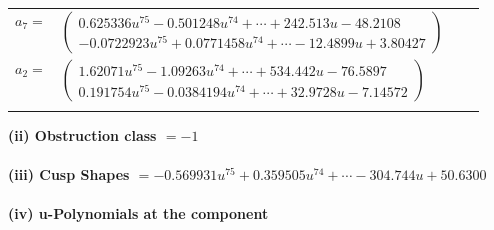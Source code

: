 \documentclass[1p]{elsarticle_modified}
\theoremstyle{definition}
\begin{document}
\begin{tabular}{m{7pt} m{180pt} m{7pt} m{180pt} }
\flushright $a_{7}=$&$\begin{pmatrix}0.625336 u^{75}-0.501248 u^{74}+\cdots+242.513 u-48.2108\\-0.0722923 u^{75}+0.0771458 u^{74}+\cdots-12.4899 u+3.80427\end{pmatrix}$ \\
\flushright $a_{2}=$&$\begin{pmatrix}1.62071 u^{75}-1.09263 u^{74}+\cdots+534.442 u-76.5897\\0.191754 u^{75}-0.0384194 u^{74}+\cdots+32.9728 u-7.14572\end{pmatrix}$\\&\end{tabular}
\flushleft \textbf{(ii) Obstruction class $= -1$}\\~\\
\flushleft \textbf{(iii) Cusp Shapes $= -0.569931 u^{75}+0.359505 u^{74}+\cdots-304.744 u+50.6300$}\\~\\
\newpage\renewcommand{\arraystretch}{1}
\flushleft \textbf{(iv) u-Polynomials at the component}\newline \\
\end{document}
